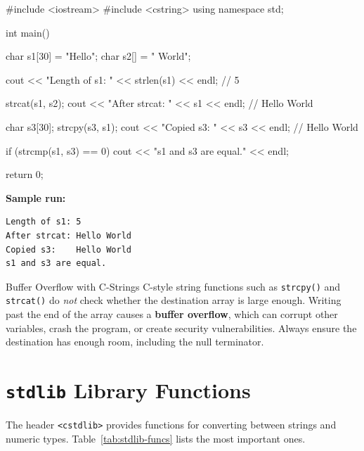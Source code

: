 \begin{cppcode}
#include <iostream>
#include <cstring>
using namespace std;

int main() {
    char s1[30] = "Hello";
    char s2[]   = " World";

    cout << "Length of s1: " << strlen(s1) << endl;   // 5

    strcat(s1, s2);
    cout << "After strcat: " << s1 << endl;           // Hello World

    char s3[30];
    strcpy(s3, s1);
    cout << "Copied s3:    " << s3 << endl;           // Hello World

    if (strcmp(s1, s3) == 0)
        cout << "s1 and s3 are equal." << endl;

    return 0;
}
\end{cppcode}

\noindent
\textbf{Sample run:}
\begin{verbatim}
Length of s1: 5
After strcat: Hello World
Copied s3:    Hello World
s1 and s3 are equal.
\end{verbatim}

\begin{warningbox}{Buffer Overflow with C-Strings}
C-style string functions such as \texttt{strcpy()} and \texttt{strcat()}
do \emph{not} check whether the destination array is large enough.
Writing past the end of the array causes a \textbf{buffer overflow},
which can corrupt other variables, crash the program, or create
security vulnerabilities.  Always ensure the destination has
enough room, including the null terminator.
\end{warningbox}

\section{\texttt{stdlib} Library Functions}
\label{sec:stdlib-funcs}

The header \texttt{<cstdlib>} provides functions for converting between
strings and numeric types.  Table~\ref{tab:stdlib-funcs} lists the most
important ones.

